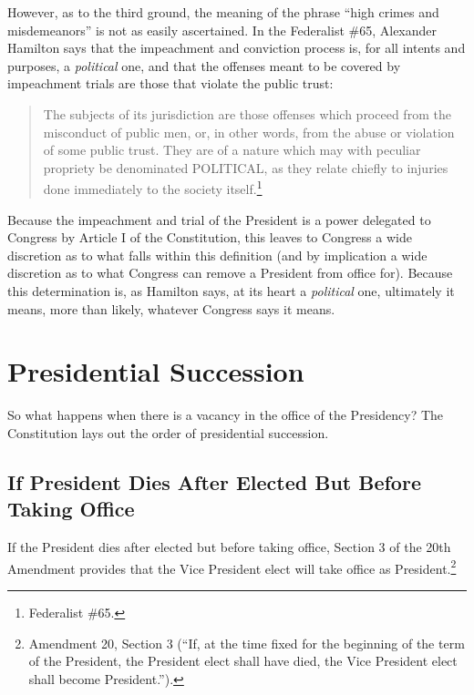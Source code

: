 However, as to the third ground, the meaning of the phrase ``high crimes and misdemeanors'' is not as easily ascertained.  In the Federalist \#65, Alexander Hamilton says that the impeachment and conviction process is, for all intents and purposes, a \textit{political} one, and that the offenses meant to be covered by impeachment trials are those that violate the public trust:

\begin{quote}
The subjects of its jurisdiction are those offenses which proceed from the misconduct of public men, or, in other words, from the abuse or violation of some public trust. They are of a nature which may with peculiar propriety be denominated POLITICAL, as they relate chiefly to injuries done immediately to the society itself.\footnote{Federalist \#65.}
\end{quote}

Because the impeachment and trial of the President is a power delegated to Congress by Article I of the Constitution, this leaves to Congress a wide discretion as to what falls within this definition (and by implication a wide discretion as to what Congress can remove a President from office for).  Because this determination is, as Hamilton says, at its heart a \textit{political} one, ultimately it means, more than likely, whatever Congress says it means.

\section{Presidential Succession}
So what happens when there is a vacancy in the office of the Presidency?
The Constitution lays out the order of presidential succession.

\subsection{If President Dies After Elected But Before Taking Office}
If the President dies after elected but before taking office, Section 3 of the 20th Amendment provides that the Vice President elect will take office as President.\footnote{Amendment 20, Section 3 (``If, at the time fixed for the beginning of the term of the President, the President elect shall have died, the Vice President elect shall become President.'').}

